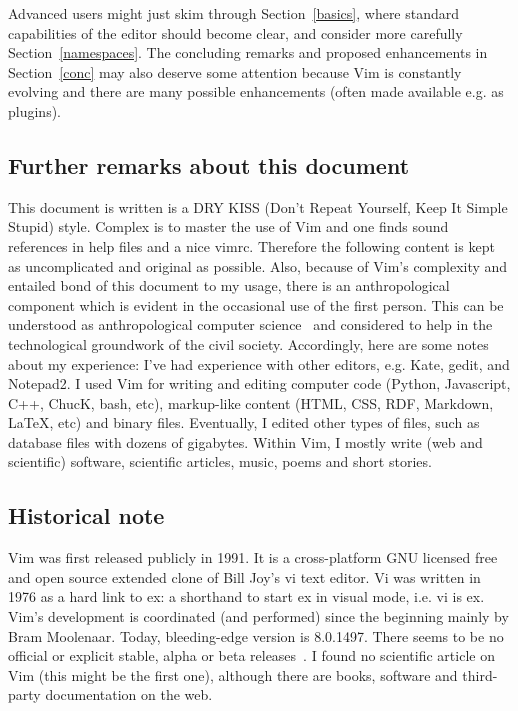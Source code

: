 \documentclass{article}
\begin{document}
Advanced users might just skim through
Section~\ref{basics}, where standard capabilities of
the editor should become clear, and consider more carefully
Section~\ref{namespaces}.
The concluding remarks and proposed enhancements in Section~\ref{conc}
may also deserve some attention because
Vim is constantly evolving
and there are many possible enhancements
(often made available e.g. as plugins).

\subsection{Further remarks about this document}
This document is written is a DRY KISS
(Don't Repeat Yourself, Keep It Simple Stupid) style.
Complex is to master the use of Vim
and one finds sound
references in help files and a nice vimrc.
Therefore the following content is kept
as uncomplicated and original as possible.
Also, because of Vim's complexity and entailed
bond of this document to my usage,
there is an anthropological component
which is evident in the occasional use of the first person.
This can be understood as anthropological computer science~\cite{anPh,anPh2}
and considered to help
in the technological groundwork of the civil society.
Accordingly, here are some notes about my experience:
I've had experience with other editors, e.g. Kate, gedit, and Notepad2.
I used Vim for writing and editing computer code 
(Python, Javascript, C++, ChucK, bash, etc), markup-like content
(HTML, CSS, RDF, Markdown, \LaTeX, etc) and binary files.
Eventually, I edited other types of files, such as database files with
dozens of gigabytes.
Within Vim, I mostly write (web and scientific) software,
scientific articles, music, poems and short stories.

\subsection{Historical note}
Vim was first released publicly in 1991.
It is a cross-platform GNU licensed free and open source
extended clone of Bill Joy's vi text editor.
Vi was written in 1976 as a hard link to ex: a shorthand
to start ex in visual mode, i.e. vi is ex.
Vim's development is coordinated (and performed) since the beginning
mainly by Bram Moolenaar.
Today, bleeding-edge version is 8.0.1497.
There seems to be no official or explicit stable, alpha or beta releases~\cite{noOfficial}.
I found no scientific article on Vim 
(this might be the first one), although there are
books, software and third-party documentation on the
web.~\cite{wikiVim}
\end{document}
